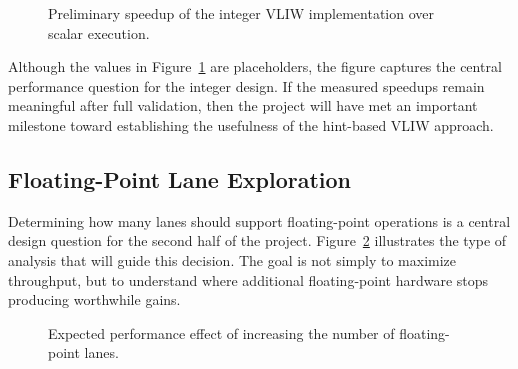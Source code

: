 \documentclass[conference,a4paper]{IEEEtran}
\begin{document}
\begin{figure}[h]
\centering
{}
\caption{Preliminary speedup of the integer VLIW implementation over scalar execution.}
\label{fig:speedup}
\end{figure}

Although the values in Figure~\ref{fig:speedup} are placeholders, the figure captures the central performance question for the integer design. If the measured speedups remain meaningful after full validation, then the project will have met an important milestone toward establishing the usefulness of the hint-based VLIW approach.

\subsection{Floating-Point Lane Exploration}

Determining how many lanes should support floating-point operations is a central design question for the second half of the project. Figure~\ref{fig:fp_lane_scaling} illustrates the type of analysis that will guide this decision. The goal is not simply to maximize throughput, but to understand where additional floating-point hardware stops producing worthwhile gains.

\begin{figure}[h]
\centering
{}
\caption{Expected performance effect of increasing the number of floating-point lanes.}
\label{fig:fp_lane_scaling}
\end{figure}
\end{document}
